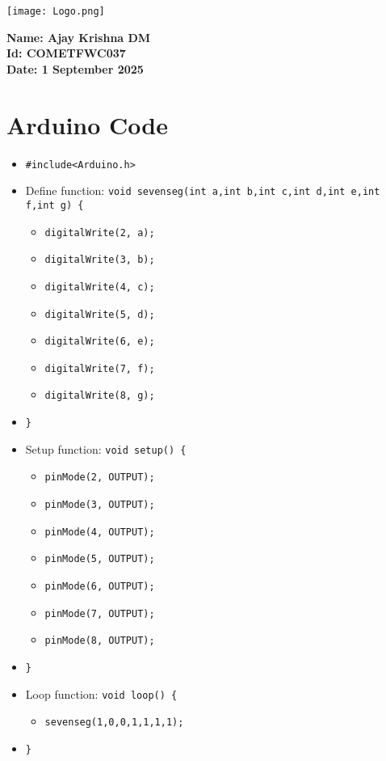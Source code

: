 \documentclass{article}
\begin{document}
\begin{minipage}{0.45\textwidth}
  \texttt{[image: Logo.png]}
\end{minipage}
\hfill
\begin{minipage}{0.45\textwidth}
  \raggedleft
  \textbf{Name: Ajay Krishna DM} \\
  \textbf{Id: COMETFWC037} \\
  \textbf{Date: 1 September 2025}
\end{minipage}

\vspace{1cm}

\section*{Arduino Code}
\begin{itemize}
  \item \texttt{\#include<Arduino.h>}
  \item Define function: \texttt{void sevenseg(int a,int b,int c,int d,int e,int f,int g) \{}
    \begin{itemize}
      \item \texttt{digitalWrite(2, a);}
      \item \texttt{digitalWrite(3, b);}
      \item \texttt{digitalWrite(4, c);}
      \item \texttt{digitalWrite(5, d);}
      \item \texttt{digitalWrite(6, e);}
      \item \texttt{digitalWrite(7, f);}
      \item \texttt{digitalWrite(8, g);}
    \end{itemize}
  \item \texttt{\}}
  \item Setup function: \texttt{void setup() \{}
    \begin{itemize}
      \item \texttt{pinMode(2, OUTPUT);}
      \item \texttt{pinMode(3, OUTPUT);}
      \item \texttt{pinMode(4, OUTPUT);}
      \item \texttt{pinMode(5, OUTPUT);}
      \item \texttt{pinMode(6, OUTPUT);}
      \item \texttt{pinMode(7, OUTPUT);}
      \item \texttt{pinMode(8, OUTPUT);}
    \end{itemize}
  \item \texttt{\}}
  \item Loop function: \texttt{void loop() \{}
    \begin{itemize}
      \item \texttt{sevenseg(1,0,0,1,1,1,1);}
    \end{itemize}
  \item \texttt{\}}
\end{itemize}
\end{document}
